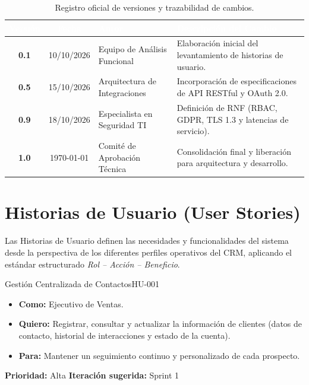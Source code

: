 \documentclass[11pt,a4paper]{article}
\begin{document}
\vspace{0.3cm}
\begin{table}[h]
    \centering
    \sffamily\small
    \renewcommand{\arraystretch}{1.3}
    \begin{tabularx}{\textwidth}{c c p{4.2cm} X}
        \toprule
        \rowcolor{PrimaryNavy}
        \textcolor{white}{\textbf{Versión}} & 
        \textcolor{white}{\textbf{Fecha}} & 
        \textcolor{white}{\textbf{Autor}} & 
        \textcolor{white}{\textbf{Descripción del Cambio}} \\
        \midrule
        \rowcolor{BgSoftGray}
        \textbf{0.1} & 10/10/2026 & Equipo de Análisis Funcional & Elaboración inicial del levantamiento de historias de usuario. \\
        \textbf{0.5} & 15/10/2026 & Arquitectura de Integraciones & Incorporación de especificaciones de API RESTful y OAuth 2.0. \\
        \rowcolor{BgSoftGray}
        \textbf{0.9} & 18/10/2026 & Especialista en Seguridad TI & Definición de RNF (RBAC, GDPR, TLS 1.3 y latencias de servicio). \\
        \textbf{1.0} & \today & Comité de Aprobación Técnica & Consolidación final y liberación para arquitectura y desarrollo. \\
        \bottomrule
    \end{tabularx}
    \caption{Registro oficial de versiones y trazabilidad de cambios.}
    \label{tab:historial_versiones}
\end{table}

\vspace{0.6cm}

\section{Historias de Usuario (User Stories)}

Las Historias de Usuario definen las necesidades y funcionalidades del sistema desde la perspectiva de los diferentes perfiles operativos del CRM, aplicando el estándar estructurado \textit{Rol -- Acción -- Beneficio}.

\begin{UserStoryBox}{Gestión Centralizada de Contactos}{HU-001}
    \sffamily
    \begin{itemize}[label=\textcolor{SecondarySteel}{\textbullet}]
        \item \textbf{Como:} Ejecutivo de Ventas.
        \item \textbf{Quiero:} Registrar, consultar y actualizar la información de clientes (datos de contacto, historial de interacciones y estado de la cuenta).
        \item \textbf{Para:} Mantener un seguimiento continuo y personalizado de cada prospecto.
    \end{itemize}
    \tcblower
    \small\textcolor{MutedText}{\textbf{Prioridad:} Alta \hfill \textbf{Iteración sugerida:} Sprint 1}
\end{UserStoryBox}
\end{document}
